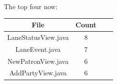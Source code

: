 The top four now:

\begin{tabular}{ |c|c|c|c| }
    \hline
    \textbf{File}       & \textbf{Count} \\
    \hline
    LaneStatusView.java & 8                          \\
    LaneEvent.java           & 7                    \\
    NewPatronView.java       & 6                        \\
    AddPartyView.java   & 6                         \\
    \hline
\end{tabular}

